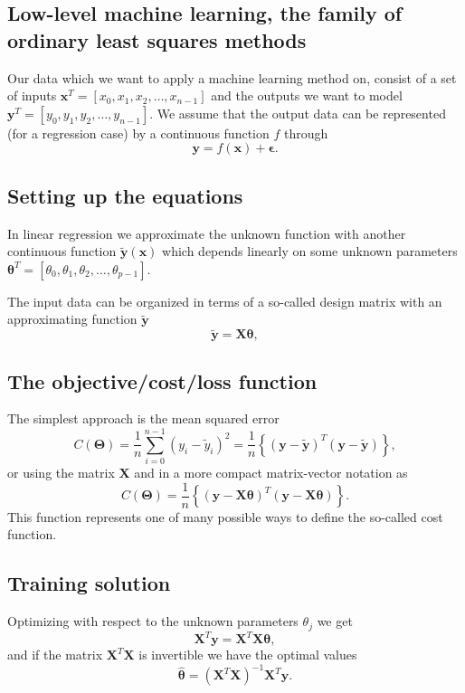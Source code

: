 \documentclass[%
oneside,                 %
final,                   %
10pt]{article}
\begin{document}
\vspace{6mm}

\subsection{Low-level machine learning, the family of ordinary least squares methods}

Our data which we want to apply a machine learning method on, consist
of a set of inputs $\bm{x}^T=[x_0,x_1,x_2,\dots,x_{n-1}]$ and the
outputs we want to model $\bm{y}^T=[y_0,y_1,y_2,\dots,y_{n-1}]$.
We assume  that the output data can be represented (for a regression case) by a continuous function $f$
through
\[
\bm{y}=f(\bm{x})+\bm{\epsilon}.
\]

\subsection{Setting up the equations}

In linear regression we approximate the unknown function with another
continuous function $\tilde{\bm{y}}(\bm{x})$ which depends linearly on
some unknown parameters
$\bm{\theta}^T=[\theta_0,\theta_1,\theta_2,\dots,\theta_{p-1}]$.

The input data can be organized in terms of a so-called design matrix 
with an approximating function $\bm{\tilde{y}}$ 
\[
\bm{\tilde{y}}= \bm{X}\bm{\theta},
\]

\subsection{The objective/cost/loss function}

The  simplest approach is the mean squared error
\[
C(\bm{\Theta})=\frac{1}{n}\sum_{i=0}^{n-1}\left(y_i-\tilde{y}_i\right)^2=\frac{1}{n}\left\{\left(\bm{y}-\bm{\tilde{y}}\right)^T\left(\bm{y}-\bm{\tilde{y}}\right)\right\},
\]
or using the matrix $\bm{X}$ and in a more compact matrix-vector notation as
\[
C(\bm{\Theta})=\frac{1}{n}\left\{\left(\bm{y}-\bm{X}\bm{\theta}\right)^T\left(\bm{y}-\bm{X}\bm{\theta}\right)\right\}.
\]
This function represents one of many possible ways to define the so-called cost function.

\subsection{Training solution}

Optimizing with respect to the unknown parameters $\theta_j$ we get 
\[
\bm{X}^T\bm{y} = \bm{X}^T\bm{X}\bm{\theta},  
\]
and if the matrix $\bm{X}^T\bm{X}$ is invertible we have the optimal values
\[
\hat{\bm{\theta}} =\left(\bm{X}^T\bm{X}\right)^{-1}\bm{X}^T\bm{y}.
\]
\end{document}
